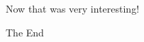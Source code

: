 \documentclass[10pt]{beamer}
\begin{document}
\begingroup
	\begin{frame}[plain,c]
		\hspace*{6 mm}
		\vspace*{-18 mm}
		\textcolor{blue_light}{\Large{Now that was very interesting!}}
	\end{frame}
	\begin{frame}[plain,c]
		\hspace*{27 mm}
		\vspace*{-20 mm}
		\textcolor{blue_light}{\Large{The End}}
	\end{frame}
\endgroup
\end{document}
